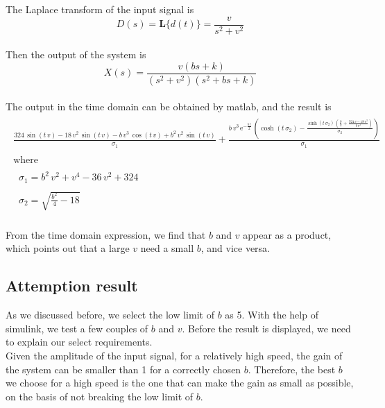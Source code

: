 \documentclass{article}
\begin{document}
The Laplace transform of the input signal is
\begin{equation*}
    D(s)=\mathbf{L} \{d(t)\}=\frac{v}{s^2+v^2}
\end{equation*}\\

Then the output of the system is
\begin{equation*}
    X(s) = \frac{v(bs+k)}{(s^2+v^2)(s^2+bs+k)}
\end{equation*}\\

The output in the time domain can be obtained by matlab, and the result is
\begin{align*}
    \begin{array}{l}
        \frac{324\,\sin \left(t\,v\right)-18\,v^2 \,\sin \left(t\,v\right)-b\,v^3 \,\cos \left(t\,v\right)+b^2 \,v^2 \,\sin \left(t\,v\right)}{\sigma_1 }+\frac{b\,v^3 \,{\mathrm{e}}^{-\frac{b\,t}{2}} \,{\left(\cosh \left(t\,\sigma_2 \right)-\frac{\sinh \left(t\,\sigma_2 \right)\,{\left(\frac{b}{2}+\frac{324\,v-18\,v^3 }{b\,v^3 }\right)}}{\sigma_2 }\right)}}{\sigma_1 }\\
        \mathrm{}\\
        \textrm{where}\\
        \mathrm{}\\
        \;\;\sigma_1 =b^2 \,v^2 +v^4 -36\,v^2 +324\\
        \mathrm{}\\
        \;\;\sigma_2 =\sqrt{\frac{b^2 }{4}-18}
        \end{array}
\end{align*}\\

From the time domain expression, we find that $b$ and $v$ appear as a product,
which points out that a large $v$ need a small $b$, and vice versa.\\

\subsection{Attemption result}

As we discussed before, we select the low limit of $b$ as 5.
With the help of simulink, we test a few couples of $b$ and $v$.
Before the result is displayed, we need to explain our select requirements.\\

Given the amplitude of the input signal, for a relatively high speed,
the gain of the system can be smaller than 1 for a correctly chosen $b$.
Therefore, the best $b$ we choose for a high speed is the one that can make the gain as small as possible,
on the basis of not breaking the low limit of $b$.\\
\end{document}
